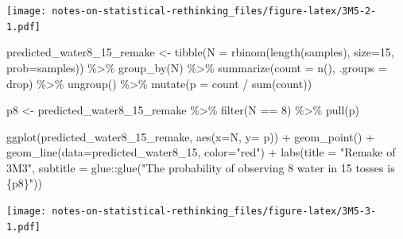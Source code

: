 \documentclass[
]{book}
\newenvironment{Shaded}{\begin{snugshade}}{\end{snugshade}}
\newcommand{\AttributeTok}[1]{\textcolor[rgb]{0.77,0.63,0.00}{#1}}
\newcommand{\DecValTok}[1]{\textcolor[rgb]{0.00,0.00,0.81}{#1}}
\newcommand{\FunctionTok}[1]{\textcolor[rgb]{0.00,0.00,0.00}{#1}}
\newcommand{\NormalTok}[1]{#1}
\newcommand{\OtherTok}[1]{\textcolor[rgb]{0.56,0.35,0.01}{#1}}
\newcommand{\SpecialCharTok}[1]{\textcolor[rgb]{0.00,0.00,0.00}{#1}}
\newcommand{\StringTok}[1]{\textcolor[rgb]{0.31,0.60,0.02}{#1}}
\begin{document}
\texttt{[image: notes-on-statistical-rethinking\_files/figure-latex/3M5-2-1.pdf]}

\begin{Shaded}
\begin{Highlighting}[]
\NormalTok{predicted\_water8\_15\_remake }\OtherTok{\textless{}{-}} 
  \FunctionTok{tibble}\NormalTok{(}\AttributeTok{N =} \FunctionTok{rbinom}\NormalTok{(}\FunctionTok{length}\NormalTok{(samples), }\AttributeTok{size=}\DecValTok{15}\NormalTok{, }\AttributeTok{prob=}\NormalTok{samples)) }\SpecialCharTok{\%\textgreater{}\%}
  \FunctionTok{group\_by}\NormalTok{(N) }\SpecialCharTok{\%\textgreater{}\%}
  \FunctionTok{summarize}\NormalTok{(}\AttributeTok{count =} \FunctionTok{n}\NormalTok{(), }\AttributeTok{.groups =} \StringTok{\textquotesingle{}drop\textquotesingle{}}\NormalTok{)  }\SpecialCharTok{\%\textgreater{}\%}
  \FunctionTok{ungroup}\NormalTok{() }\SpecialCharTok{\%\textgreater{}\%}
  \FunctionTok{mutate}\NormalTok{(}\AttributeTok{p =}\NormalTok{ count }\SpecialCharTok{/} \FunctionTok{sum}\NormalTok{(count))}
  
\NormalTok{p8 }\OtherTok{\textless{}{-}} 
\NormalTok{  predicted\_water8\_15\_remake }\SpecialCharTok{\%\textgreater{}\%}
  \FunctionTok{filter}\NormalTok{(N }\SpecialCharTok{==} \DecValTok{8}\NormalTok{) }\SpecialCharTok{\%\textgreater{}\%}
  \FunctionTok{pull}\NormalTok{(p)}

\FunctionTok{ggplot}\NormalTok{(predicted\_water8\_15\_remake, }\FunctionTok{aes}\NormalTok{(}\AttributeTok{x=}\NormalTok{N, }\AttributeTok{y=}\NormalTok{ p)) }\SpecialCharTok{+} 
  \FunctionTok{geom\_point}\NormalTok{() }\SpecialCharTok{+} 
  \FunctionTok{geom\_line}\NormalTok{(}\AttributeTok{data=}\NormalTok{predicted\_water8\_15, }\AttributeTok{color=}\StringTok{"red"}\NormalTok{) }\SpecialCharTok{+}
  \FunctionTok{labs}\NormalTok{(}\AttributeTok{title =} \StringTok{"Remake of 3M3"}\NormalTok{,}
       \AttributeTok{subtitle =}\NormalTok{ glue}\SpecialCharTok{::}\FunctionTok{glue}\NormalTok{(}\StringTok{"The probability of observing 8 water in 15 tosses is \{p8\}"}\NormalTok{))}
\end{Highlighting}
\end{Shaded}

\texttt{[image: notes-on-statistical-rethinking\_files/figure-latex/3M5-3-1.pdf]}
\end{document}
